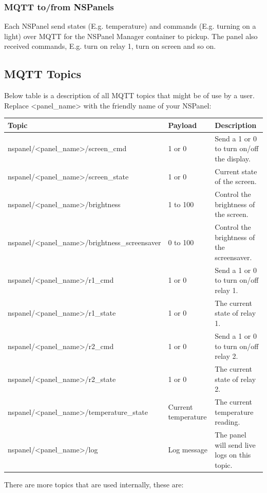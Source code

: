 \documentclass[10pt]{article}
\begin{document}
    \subsubsection{MQTT to/from NSPanels}
    Each NSPanel send states (E.g. temperature) and commands (E.g. turning on a light) over MQTT for the NSPanel Manager container to pickup. The panel also received commands, E.g. turn on relay 1, turn on screen and so on.

    \subsection{MQTT Topics}
    Below table is a description of all MQTT topics that might be of use by a user. Replace <panel\_name> with the friendly name of your NSPanel:
    \begin{table}[H]
    \begin{tabular}{|l|l|l|}
    \hline
    \textbf{Topic} & \textbf{Payload}  & \textbf{Description}  \\ \hline
    nspanel/<panel\_name>/screen\_cmd & 1 or 0 & Send a 1 or 0 to turn on/off the display. \\ \hline
    nspanel/<panel\_name>/screen\_state & 1 or 0 & Current state of the screen. \\ \hline
    nspanel/<panel\_name>/brightness & 1 to  100 & Control the brightness of the screen. \\ \hline
    nspanel/<panel\_name>/brightness\_screensaver & 0 to  100 & Control the brightness of the screensaver. \\ \hline
    nspanel/<panel\_name>/r1\_cmd & 1 or 0 & Send a 1 or 0 to turn on/off relay 1. \\ \hline
    nspanel/<panel\_name>/r1\_state & 1 or 0 & The current state of relay 1. \\ \hline
    nspanel/<panel\_name>/r2\_cmd & 1 or 0 & Send a 1 or 0 to turn on/off relay 2. \\ \hline
    nspanel/<panel\_name>/r2\_state & 1 or 0 & The current state of relay 2. \\ \hline
    nspanel/<panel\_name>/temperature\_state & Current temperature & The current temperature reading. \\ \hline
    nspanel/<panel\_name>/log & Log message & The panel will send live logs on this topic. \\ \hline
    \end{tabular}
    \end{table}

    There are more topics that are used internally, these are:
\end{document}
